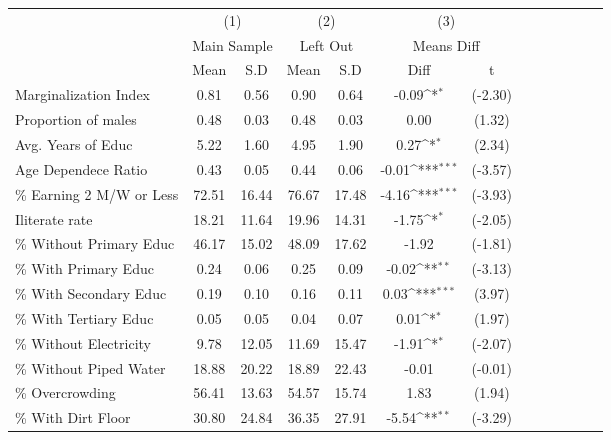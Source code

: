 {
\def\sym#1{\ifmmode^{#1}\else\(^{#1}\)\fi}
\begin{tabular}{l*{3}{cccc}}
\hline\hline
                    &\multicolumn{2}{c}{(1)}  &\multicolumn{2}{c}{(2)}  &\multicolumn{2}{c}{(3)}           \\
                    &\multicolumn{2}{c}{Main Sample}&\multicolumn{2}{c}{Left Out}&\multicolumn{2}{c}{Means Diff}    \\
                    &        Mean&         S.D&        Mean&         S.D&        Diff         &           t\\
\hline
Marginalization Index&        0.81&        0.56&        0.90&        0.64&       -0.09\sym{*}  &     (-2.30)\\
Proportion of males &        0.48&        0.03&        0.48&        0.03&        0.00         &      (1.32)\\
Avg. Years of Educ  &        5.22&        1.60&        4.95&        1.90&        0.27\sym{*}  &      (2.34)\\
Age Dependece Ratio &        0.43&        0.05&        0.44&        0.06&       -0.01\sym{***}&     (-3.57)\\
\% Earning 2 M/W or Less&       72.51&       16.44&       76.67&       17.48&       -4.16\sym{***}&     (-3.93)\\
Iliterate rate      &       18.21&       11.64&       19.96&       14.31&       -1.75\sym{*}  &     (-2.05)\\
\% Without Primary Educ&       46.17&       15.02&       48.09&       17.62&       -1.92         &     (-1.81)\\
\% With Primary Educ&        0.24&        0.06&        0.25&        0.09&       -0.02\sym{**} &     (-3.13)\\
\% With Secondary Educ&        0.19&        0.10&        0.16&        0.11&        0.03\sym{***}&      (3.97)\\
\% With Tertiary Educ&        0.05&        0.05&        0.04&        0.07&        0.01\sym{*}  &      (1.97)\\
\% Without Electricity&        9.78&       12.05&       11.69&       15.47&       -1.91\sym{*}  &     (-2.07)\\
\% Without Piped Water&       18.88&       20.22&       18.89&       22.43&       -0.01         &     (-0.01)\\
\% Overcrowding     &       56.41&       13.63&       54.57&       15.74&        1.83         &      (1.94)\\
\% With Dirt Floor  &       30.80&       24.84&       36.35&       27.91&       -5.54\sym{**} &     (-3.29)\\

\end{tabular}}
